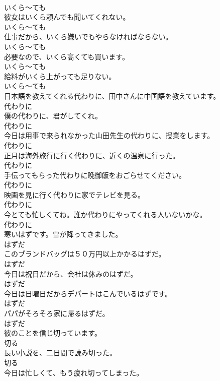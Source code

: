 \documentclass[8pt]{extreport}
\begin{document}
\begin{CJK}{UTF8}{min}
\\	いくら～ても
\\	彼女はいくら頼んでも聞いてくれない。	
\\	いくら～ても
\\	仕事だから、いくら嫌いでもやらなければならない。	
\\	いくら～ても
\\	必要なので、いくら高くても買います。	
\\	いくら～ても
\\	給料がいくら上がっても足りない。	
\\	いくら～ても
\\	日本語を教えてくれる代わりに、田中さんに中国語を教えています。	
\\	代わりに
\\	僕の代わりに、君がしてくれ。	
\\	代わりに
\\	今日は用事で来られなかった山田先生の代わりに、授業をします。	
\\	代わりに
\\	正月は海外旅行に行く代わりに、近くの温泉に行った。	
\\	代わりに
\\	手伝ってもらった代わりに晩御飯をおごらせてください。	
\\	代わりに
\\	映画を見に行く代わりに家でテレビを見る。	
\\	代わりに
\\	今とても忙しくてね。誰か代わりにやってくれる人いないかな。	
\\	代わりに
\\	寒いはずです。雪が降ってきました。	
\\	はずだ
\\	このブランドバッグは５０万円以上かかるはずだ。	
\\	はずだ
\\	今日は祝日だから、会社は休みのはずだ。	
\\	はずだ
\\	今日は日曜日だからデパートはこんでいるはずです。	
\\	はずだ
\\	パパがそろそろ家に帰るはずだ。	
\\	はずだ
\\	彼のことを信じ切っています。	
\\	切る
\\	長い小説を、二日間で読み切った。	
\\	切る
\\	今日は忙しくて、もう疲れ切ってしまった。	

\end{CJK}
\end{document}
